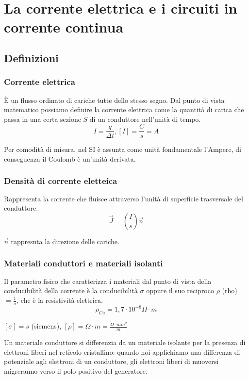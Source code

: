 \section{La corrente elettrica e i circuiti in corrente continua}
\subsection{Definizioni}
    \subsubsection{Corrente elettrica}
        \par È un flusso ordinato di cariche tutte dello stesso segno. Dal punto di vista matematico possiamo definire la corrente elettrica come la quantità di carica che passa in una certa sezione $S$ di un conduttore nell'unità di tempo.
        \begin{equation*}
            I=\frac{q}{\Delta t}, [I]=\frac{C}{s}=A
        \end{equation*}
        \par Per comodità di misura, nel SI è assunta come unità fondamentale l'Ampere, di conseguenza il Coulomb è un'unità derivata.
    \subsubsection{Densità di corrente eletteica}
        \par Rappresenta la corrente che fluisce attraverso l'unità di superficie trasversale del conduttore.
        \begin{equation}
            \vec{J}=\left(\frac{I}{s}\right)\vec{n}
        \end{equation}
        \par $\vec{n}$ rappresnta la direzione delle cariche.
    \subsubsection{Materiali conduttori e materiali isolanti}
        \par Il parametro fisico che caratterizza i materiali dal punto di vista della conducibilità della corrente è la conducibilità $\sigma$ oppure il suo reciproco $\rho$ (rho) $=\frac{1}{\sigma}$, che è la resistività elettrica.
        \begin{equation*}\rho_{Cu}=1,7\cdot10^{-8}\Omega\cdot m\end{equation*}
        \par $[\sigma]=s$ (siemens), $[\rho]=\Omega\cdot m=\frac{\Omega\cdot mm^2}{m}$
        \par Un materiale conduttore si differenzia da un materiale isolante per la presenza di elettroni liberi nel reticolo cristallino: quando noi applichiamo una differenza di potenziale agli elettroni di un conduttore, gli elettroni liberi di muoversi migreranno verso il polo positivo del generatore.
